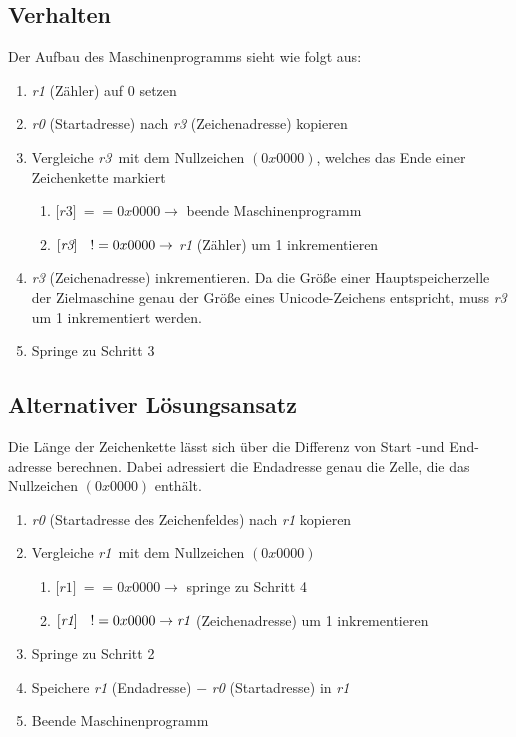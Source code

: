 \documentclass[12pt,a4paper]{article}
\begin{document}
\subsection{Verhalten}
Der Aufbau des Maschinenprogramms sieht wie folgt aus: 
\begin {enumerate}
\item \textit{r1} (Zähler) auf 0 setzen
\item \textit{r0} (Startadresse) nach \textit{r3} (Zeichenadresse) kopieren
\item Vergleiche \lbrack \textit{r3}\rbrack \footnotemark[1] \ mit dem Nullzeichen \((0x0000)\), welches das Ende einer Zeichenkette markiert
\begin {enumerate}
\item \(\lbrack \textit {r3}\rbrack \ == 0x0000 \rightarrow\) beende Maschinenprogramm
\item \(\lbrack \textit{r3}\rbrack \hspace{6 pt} \ != 0x0000 \rightarrow\) \textit{r1} (Zähler) um 1 inkrementieren
\end {enumerate}
\item \textit{r3} (Zeichenadresse) inkrementieren. Da die Größe einer Hauptspeicherzelle der Zielmaschine genau der Größe eines Unicode-Zeichens entspricht, muss \textit{r3} um 1 inkrementiert werden. 
\item Springe zu Schritt 3
\end {enumerate}

\subsection{Alternativer Lösungsansatz}
Die Länge der Zeichenkette lässt sich über die Differenz von Start -und End-adresse berechnen. Dabei adressiert die Endadresse genau die Zelle, die das Nullzeichen \((0x0000)\) enthält.
\begin{enumerate}
\item \textit{r0} (Startadresse des Zeichenfeldes) nach \textit{r1} kopieren
\item Vergleiche \lbrack \textit{r1}\rbrack \ mit dem Nullzeichen \((0x0000)\)
\begin{enumerate}
\item \(\lbrack \textit{r1}\rbrack \ == 0x0000 \rightarrow \) springe zu Schritt 4
\item \(\lbrack \textit{r1}\rbrack \hspace{6 pt} \ != 0x0000 \rightarrow \textit{r1} \) (Zeichenadresse) um 1 inkrementieren
\end{enumerate}
\item Springe zu Schritt 2
\item Speichere \textit{r1} (Endadresse) \(-\) \textit{r0} (Startadresse) in \textit{r1}
\item Beende Maschinenprogramm
\end {enumerate}
\end{document}
